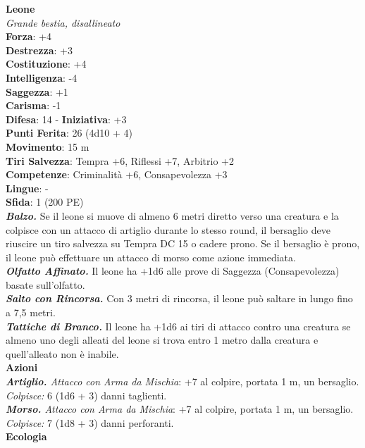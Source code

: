 \begin{multicols}{2}
\medskip\textbf{Leone}\\
\emph{Grande bestia, disallineato}\\
\textbf{Forza}: +4\\
\textbf{Destrezza}: +3\\
\textbf{Costituzione}: +4\\
\textbf{Intelligenza}: -4\\
\textbf{Saggezza}: +1\\
\textbf{Carisma}: -1\\
\textbf{Difesa}: 14 - \textbf{Iniziativa}: +3\\
\textbf{Punti Ferita}: 26 (4d10 + 4)\\
\textbf{Movimento}: 15 m\\
\textbf{Tiri Salvezza}: Tempra +6, Riflessi +7, Arbitrio +2 \\
\textbf{Competenze}: Criminalità +6, Consapevolezza +3\\
\textbf{Lingue}: -\\
\textbf{Sfida}: 1 (200 PE)\smallskip\\
\emph{\textbf{Balzo.}} Se il leone si muove di almeno 6 metri diretto verso una creatura e la colpisce con un attacco di artiglio durante lo stesso round, il bersaglio deve riuscire un tiro salvezza su Tempra DC  15 o cadere prono. Se il bersaglio è prono, il leone può effettuare un attacco di morso come azione immediata.\\
\emph{\textbf{Olfatto Affinato.}} Il leone ha +1d6 alle prove di Saggezza (Consapevolezza) basate sull'olfatto.\\
\emph{\textbf{Salto con Rincorsa.}} Con 3 metri di rincorsa, il leone può saltare in lungo fino a 7,5 metri.\\
\emph{\textbf{Tattiche di Branco.}} Il leone ha +1d6 ai tiri di attacco contro una creatura se almeno uno degli alleati del leone si trova entro 1 metro dalla creatura e quell'alleato non è inabile.\\
\smallskip\textbf{Azioni}\\
\emph{\textbf{Artiglio.} Attacco con Arma da Mischia}: +7 al colpire, portata 1 m, un bersaglio.\\
\emph{Colpisce:} 6 (1d6 + 3) danni taglienti.\\
\emph{\textbf{Morso.} Attacco con Arma da Mischia}: +7 al colpire, portata 1 m, un bersaglio.\\
\emph{Colpisce:} 7 (1d8 + 3) danni perforanti.\\
\textbf{Ecologia}\\

\end{multicols}
